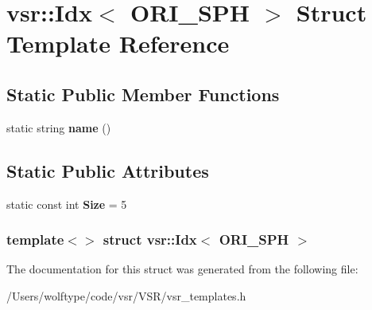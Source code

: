 \hypertarget{structvsr_1_1_idx_3_01_o_r_i___s_p_h_01_4}{\section{vsr\-:\-:Idx$<$ O\-R\-I\-\_\-\-S\-P\-H $>$ Struct Template Reference}
\label{structvsr_1_1_idx_3_01_o_r_i___s_p_h_01_4}
}
\subsection*{Static Public Member Functions}
\begin{DoxyCompactItemize}
\item 
\hypertarget{structvsr_1_1_idx_3_01_o_r_i___s_p_h_01_4_aaa18eb4ad2892e6c31d5de8b14e14739}{static string {\bfseries name} ()}\label{structvsr_1_1_idx_3_01_o_r_i___s_p_h_01_4_aaa18eb4ad2892e6c31d5de8b14e14739}

\end{DoxyCompactItemize}
\subsection*{Static Public Attributes}
\begin{DoxyCompactItemize}
\item 
\hypertarget{structvsr_1_1_idx_3_01_o_r_i___s_p_h_01_4_a5380aa85c5ea44e4b0a4dcebf299a81d}{static const int {\bfseries Size} = 5}\label{structvsr_1_1_idx_3_01_o_r_i___s_p_h_01_4_a5380aa85c5ea44e4b0a4dcebf299a81d}

\end{DoxyCompactItemize}
\subsubsection*{template$<$$>$ struct vsr\-::\-Idx$<$ O\-R\-I\-\_\-\-S\-P\-H $>$}



The documentation for this struct was generated from the following file\-:\begin{DoxyCompactItemize}
\item 
/\-Users/wolftype/code/vsr/\-V\-S\-R/vsr\-\_\-templates.\-h\end{DoxyCompactItemize}
